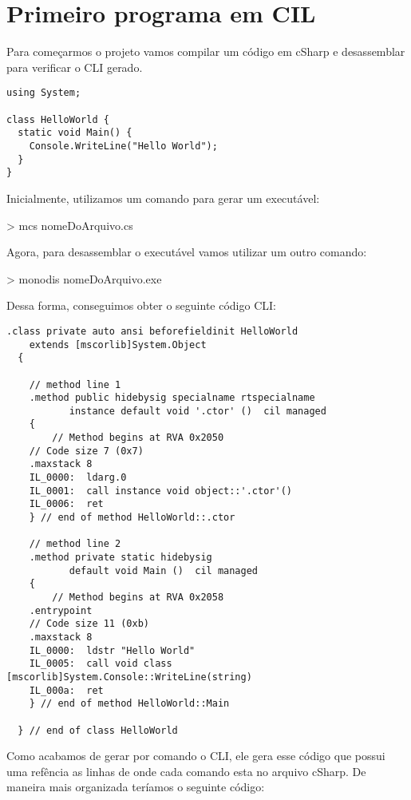 \documentclass[12pt,a4paper,twoside]{report}
\begin{document}
\section{Primeiro programa em CIL}
Para começarmos o projeto vamos compilar um código em cSharp e desassemblar para verificar o CLI gerado.

\begin{verbatim}
using System;

class HelloWorld {
  static void Main() {
    Console.WriteLine("Hello World");
  }
}
\end{verbatim}

Inicialmente, utilizamos um comando para gerar um executável:

\begin{terminal}
> mcs nomeDoArquivo.cs
\end{terminal}

Agora, para desassemblar o executável vamos utilizar um outro comando:

\begin{terminal}
> monodis nomeDoArquivo.exe
\end{terminal}

Dessa forma, conseguimos obter o seguinte código CLI:

\begin{verbatim}
.class private auto ansi beforefieldinit HelloWorld
  	extends [mscorlib]System.Object
  {

    // method line 1
    .method public hidebysig specialname rtspecialname 
           instance default void '.ctor' ()  cil managed 
    {
        // Method begins at RVA 0x2050
	// Code size 7 (0x7)
	.maxstack 8
	IL_0000:  ldarg.0 
	IL_0001:  call instance void object::'.ctor'()
	IL_0006:  ret 
    } // end of method HelloWorld::.ctor

    // method line 2
    .method private static hidebysig 
           default void Main ()  cil managed 
    {
        // Method begins at RVA 0x2058
	.entrypoint
	// Code size 11 (0xb)
	.maxstack 8
	IL_0000:  ldstr "Hello World"
	IL_0005:  call void class [mscorlib]System.Console::WriteLine(string)
	IL_000a:  ret 
    } // end of method HelloWorld::Main

  } // end of class HelloWorld
\end{verbatim}

Como acabamos de gerar por comando o CLI, ele gera esse código que possui uma refência as linhas de onde cada comando esta no arquivo cSharp. De maneira mais organizada teríamos o seguinte código:
\end{document}
